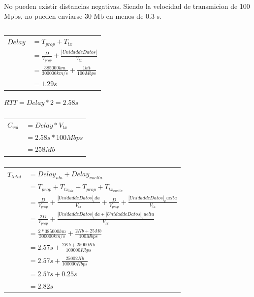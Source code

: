 No pueden existir distancias negativas. Siendo la velocidad de transmicion de 100 Mpbs, no pueden enviarse 30 Mb en menos de 0.3 s.

\subsection{}
\subsubsection{}
\begin{tabular}{rl}
$Delay$ & $= T_{prop} + T_{tx}$ \\
& $= \frac{D}{V_{prop}} + \frac{|Unidad de Datos|}{V_{tx}}$ \\
& $= \frac{385000km}{300000km/s} + \frac{1bit}{100Mbps}$ \\
& $= 1.29s$
\end{tabular}

$RTT = Delay * 2 = 2.58s$

\subsubsection{}
\begin{tabular}{rl}
$C_{vol}$ & $= Delay * V_{tx}$ \\
& $= 2.58s * 100Mbps$ \\
& $= 258Mb$ \\
\end{tabular}

\subsubsection{}
\begin{tabular}{rl}
$T_{total}$ & $= Delay_{ida} + Delay_{vuelta}$ \\
& $= T_{prop} + T_{tx_{ida}} + T_{prop} + T_{tx_{vuelta}}$ \\
& $= \frac{D}{V_{prop}} + \frac{|Unidad de Datos|_ida}{V_{tx}} + \frac{D}{V_{prop}} + \frac{|Unidad de Datos|_vuelta}{V_{tx}}$ \\
& $= \frac{2D}{V_{prop}} + \frac{|Unidad de Datos|_ida + |Unidad de Datos|_vuelta}{V_{tx}}$ \\
& $= \frac{2 * 385000km}{300000km/s} + \frac{2Kb + 25Mb}{100Mbps}$ \\
& $= 2.57s + \frac{2Kb + 25000Kb}{100000Kbps}$ \\
& $= 2.57s + \frac{25002Kb}{100000Kbps}$ \\
& $= 2.57s + 0.25s$ \\
& $= 2.82s$ \\
\end{tabular}
